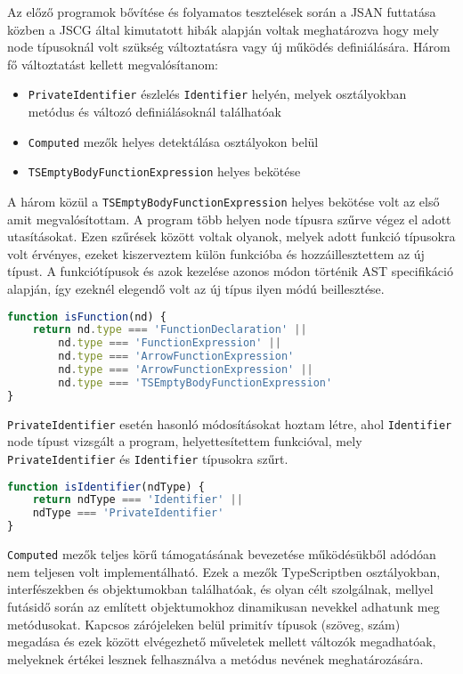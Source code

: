 Az előző programok bővítése és folyamatos tesztelések során a JSAN futtatása közben a JSCG által kimutatott hibák alapján voltak meghatározva hogy mely node típusoknál volt szükség változtatásra vagy új működés definiálására. Három fő változtatást kellett megvalósítanom:

\begin{itemize}
    \item \texttt{PrivateIdentifier} észlelés \texttt{Identifier} helyén, melyek osztályokban metódus és változó definiálásoknál találhatóak
    \item \texttt{Computed} mezők helyes detektálása osztályokon belül
    \item \texttt{TSEmptyBodyFunctionExpression} helyes bekötése
\end{itemize}

A három közül a \texttt{TSEmptyBodyFunctionExpression} helyes bekötése volt az első amit megvalósítottam. A program több helyen node típusra szűrve végez el adott utasításokat. Ezen szűrések között voltak olyanok, melyek adott funkció típusokra volt érvényes, ezeket kiszerveztem külön funkcióba és hozzáillesztettem az új típust. A funkciótípusok és azok kezelése azonos módon történik AST specifikáció alapján, így ezeknél elegendő volt az új típus ilyen módú beillesztése.

\begin{lstlisting}[caption={Funkció típus szűrő},label={lst:functiontype}, language={JavaScript}]
function isFunction(nd) {
    return nd.type === 'FunctionDeclaration' ||
        nd.type === 'FunctionExpression' ||
        nd.type === 'ArrowFunctionExpression'
        nd.type === 'ArrowFunctionExpression' ||
        nd.type === 'TSEmptyBodyFunctionExpression'
}
\end{lstlisting}

\texttt{PrivateIdentifier} esetén hasonló módosításokat hoztam létre, ahol \texttt{Identifier} node típust vizsgált a program, helyettesítettem funkcióval, mely \texttt{PrivateIdentifier} és \texttt{Identifier} típusokra szűrt.

\begin{lstlisting}[caption={Identifier típus szűrő},label={lst:jsonconfig}, language={JavaScript}]
function isIdentifier(ndType) {
    return ndType === 'Identifier' ||
    ndType === 'PrivateIdentifier'
}
\end{lstlisting}

\texttt{Computed} mezők teljes körű támogatásának bevezetése működésükből adódóan nem teljesen volt implementálható.
Ezek a mezők TypeScriptben osztályokban, interfészekben és objektumokban találhatóak, és olyan célt szolgálnak, mellyel futásidő során az említett objektumokhoz dinamikusan nevekkel adhatunk meg metódusokat. Kapcsos zárójeleken belül primitív típusok (szöveg, szám) megadása és ezek között elvégezhető műveletek mellett változók megadhatóak, melyeknek értékei lesznek felhasználva a metódus nevének meghatározására.

